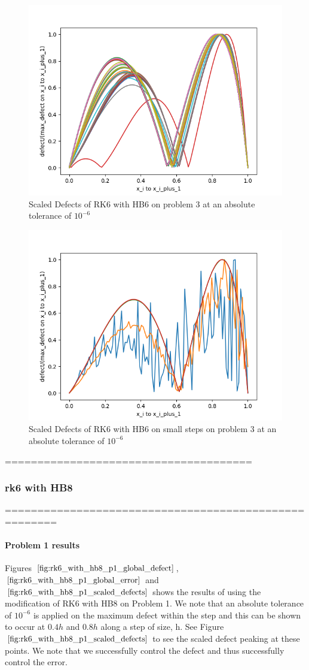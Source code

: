 \documentclass{article}
\begin{document}
\begin{figure}[H]
\centering
\includegraphics[width=0.7\linewidth]{./figures/rk6_with_hb6_p3_scaled_defects}
\caption{Scaled Defects of RK6 with HB6 on problem 3 at an absolute tolerance of $10^{-6}$}
\label{fig:rk6_with_hb6_p3_scaled_defects}
\end{figure}

\begin{figure}[H]
\centering
\includegraphics[width=0.7\linewidth]{./figures/rk6_with_hb6_p3_scaled_defects_small_steps}
\caption{Scaled Defects of RK6 with HB6 on small steps on problem 3 at an absolute tolerance of $10^{-6}$}
\label{fig:rk6_with_hb6_p3_scaled_defects_small_steps}
\end{figure}

======================================

\subsubsection{rk6 with HB8}
======================================================
\paragraph{Problem 1 results}
Figures $\ref{fig:rk6_with_hb8_p1_global_defect}$, $\ref{fig:rk6_with_hb8_p1_global_error}$ and $\ref{fig:rk6_with_hb8_p1_scaled_defects}$ shows the results of using the modification of RK6 with HB8 on Problem 1. We note that an absolute tolerance of $10^{-6}$ is applied on the maximum defect within the step and this can be shown to occur at $0.4h$ and $0.8h$ along a step of size, h. See Figure $\ref{fig:rk6_with_hb8_p1_scaled_defects}$ to see the scaled defect peaking at these points. We note that we successfully control the defect and thus successfully control the error.
\end{document}
